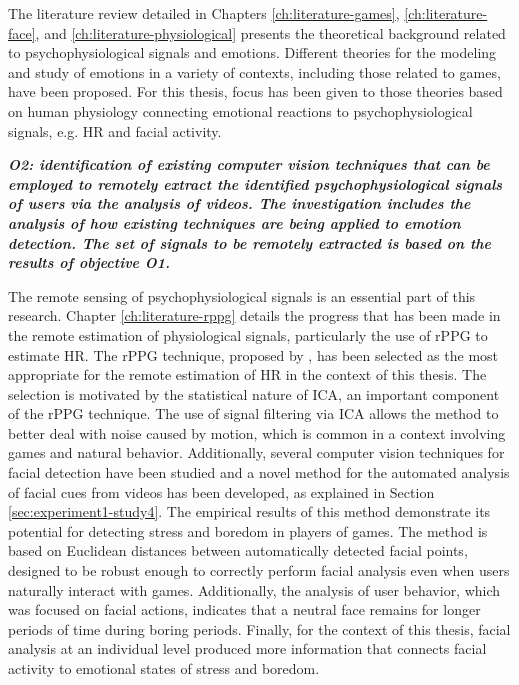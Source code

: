 The literature review detailed in Chapters \ref{ch:literature-games}, \ref{ch:literature-face}, and \ref{ch:literature-physiological} presents the theoretical background related to psychophysiological signals and emotions. Different theories for the modeling and study of emotions in a variety of contexts, including those related to games, have been proposed. For this thesis, focus has been given to those theories based on human physiology connecting emotional reactions to psychophysiological signals, e.g. HR and facial activity.

\textit{\textbf{O2: identification of existing computer vision techniques that can be employed to remotely extract the identified psychophysiological signals of users via the analysis of videos. The investigation includes the analysis of how existing techniques are being applied to emotion detection. The set of signals to be remotely extracted is based on the results of objective \textbf{O1}.}}

The remote sensing of psychophysiological signals is an essential part of this research. Chapter \ref{ch:literature-rppg} details the progress that has been made in the remote estimation of physiological signals, particularly the use of rPPG to estimate HR. The rPPG technique, proposed by \textcite{poh2011advancements}, has been selected as the most appropriate for the remote estimation of HR in the context of this thesis. The selection is motivated by the statistical nature of ICA, an important component of the rPPG technique. The use of signal filtering via ICA allows the method to better deal with noise caused by motion, which is common in a context involving games and natural behavior. Additionally, several computer vision techniques for facial detection have been studied and a novel method for the automated analysis of facial cues from videos has been developed, as explained in Section \ref{sec:experiment1-study4}. The empirical results of this method demonstrate its potential for detecting stress and boredom in players of games. The method is based on Euclidean distances between automatically detected facial points, designed to be robust enough to correctly perform facial analysis even when users naturally interact with games. Additionally, the analysis of user behavior, which was focused on facial actions, indicates that a neutral face remains for longer periods of time during boring periods. Finally, for the context of this thesis, facial analysis at an individual level produced more information that connects facial activity to emotional states of stress and boredom.

